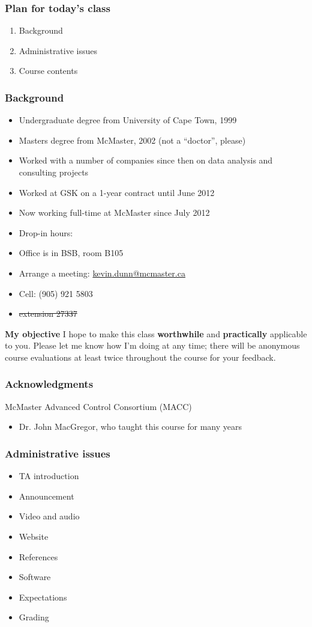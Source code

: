 \begin{frame}\frametitle{Plan for today's class}
	\begin{enumerate}
		\item	Background 
		\item	Administrative issues 
		\item	Course contents 
	\end{enumerate}
\end{frame}

\begin{frame}\frametitle{Background}
	{\color{myGreen}{About myself}}
	\begin{itemize}
		\item	Undergraduate degree from University of Cape Town, 1999
		\item	Masters degree from McMaster, 2002 (not a ``doctor'', please)
		\item	Worked with a number of companies since then on data analysis and consulting projects
		\item	Worked at GSK on a 1-year contract until June 2012
		\item	Now working full-time at McMaster since July 2012
		\item	Drop-in hours: 
		\item	Office is in BSB, room B105
		\item	Arrange a meeting: \url{kevin.dunn@mcmaster.ca}
		\item	Cell: (905) 921 5803
		\item	\sout{extension 27337}
	\end{itemize}
	
	\textbf{My objective}
	\vspace{12pt}
	I hope to make this class \textbf{worthwhile} and \textbf{practically} applicable to you. Please let me know how I'm doing at any time; there will be anonymous course evaluations at least twice throughout the course for your feedback.
\end{frame}

\begin{frame}\frametitle{Acknowledgments}
	
	McMaster Advanced Control Consortium (MACC) 
	\begin{itemize}
		\item	Dr. John MacGregor, who taught this course for many years 
	\end{itemize}
\end{frame}

\begin{frame}\frametitle{Administrative issues}
	\begin{itemize}
		\item	TA introduction 
		\item	Announcement 
		\item	Video and audio 
		\item	Website 
		\item	References 
		\item	Software 
		\item	Expectations 
		\item	Grading 
	\end{itemize}
\end{frame}

